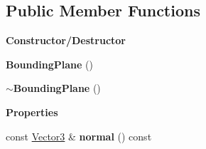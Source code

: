 \subsection*{Public Member Functions}
\begin{Indent}\textbf{ Constructor/\+Destructor}\par
\begin{DoxyCompactItemize}
\item 
\mbox{\label{classrev_1_1_bounding_plane_a153f3d94f714f0f67931283f4a7ed2e3}} 
{\bfseries Bounding\+Plane} ()
\item 
\mbox{\label{classrev_1_1_bounding_plane_a5e11200efadda65e9241fa5f7b017d14}} 
{\bfseries $\sim$\+Bounding\+Plane} ()
\end{DoxyCompactItemize}
\end{Indent}
\begin{Indent}\textbf{ Properties}\par
\begin{DoxyCompactItemize}
\item 
\mbox{\label{classrev_1_1_bounding_plane_a23d8a0e308907256346a721ffcbf88e5}} 
const \mbox{\hyperlink{classrev_1_1_vector}{Vector3}} \& {\bfseries normal} () const
\end{DoxyCompactItemize}
\end{Indent}
